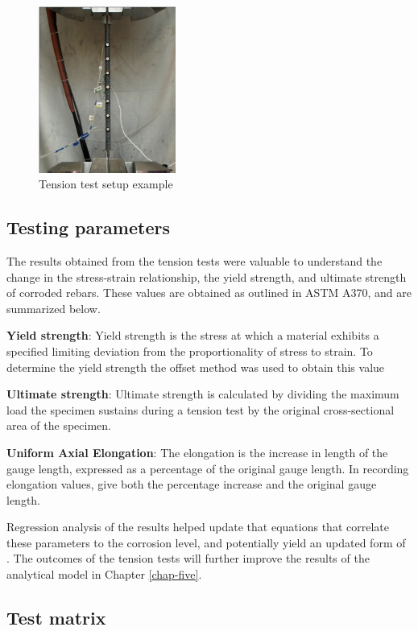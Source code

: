 \begin{figure}[htbp]
	\centering
	\includegraphics[width=0.4\textwidth]{Chapter-3/figs/TensionTest}
	\caption{Tension test setup example\cite{Overby2016}}
	\label{fig:TensionTest}
\end{figure}

\subsection{Testing parameters}
The results obtained from the tension tests were valuable to understand the change in the stress-strain relationship, the yield strength, and ultimate strength of corroded rebars. These values are obtained as outlined in ASTM A370, and are summarized below.


\textbf{Yield strength}: Yield strength is the stress at which a material exhibits a specified limiting deviation from the proportionality of stress to strain. To determine the yield strength the offset method was used to obtain this value

\textbf{Ultimate strength}: Ultimate strength is calculated by dividing the maximum load the specimen sustains during a tension test by the original cross-sectional area of the specimen.

\textbf{Uniform Axial Elongation}: The elongation is the increase in length of the gauge length, expressed as a percentage of the original gauge length. In recording elongation values, give both the percentage increase and the original gauge length.

Regression analysis of the results helped update that equations that correlate these parameters to the corrosion level, and potentially yield an updated form of  . The outcomes of the tension tests will further improve the results of the analytical model in Chapter \ref{chap-five}.

\subsection{Test matrix}

